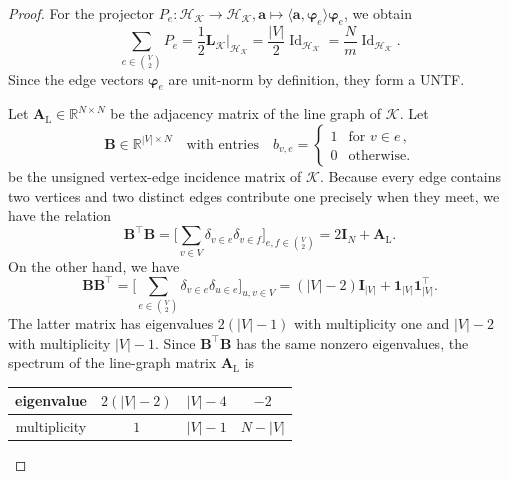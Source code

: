 \documentclass[10pt,a4paper]{amsart}
\DeclareMathOperator{\Id}{Id}
\begin{document}
\begin{proof}
    For the projector $P_e\colon\mathcal H_{\mathcal K}\to\mathcal H_{\mathcal K}, \bm a\mapsto \langle\bm a,\bm\varphi_e\rangle\bm\varphi_e$, we obtain
    \begin{equation*}
        \sum_{e\in\binom V2}P_e
        =\frac12\bm L_{\mathcal K}\big|_{\mathcal H_{\mathcal K}}
        =\frac {|V|}2\Id_{\mathcal H_{\mathcal K}}
        =\frac Nm\Id_{\mathcal H_{\mathcal K}}.
    \end{equation*}
    Since the edge vectors $\bm\varphi_e$ are unit-norm by definition, they form a UNTF.

    Let $\bm A_{\mathrm L} \in\mathds R^{N\times N}$ be the adjacency matrix of the line graph of $\mathcal K$.
    Let
    \begin{equation*}
        \bm B\in\mathds R^{|V|\times N}
        \quad\text{with entries}\quad
        b_{v,e} = \begin{cases}1 & \text{for } v\in e\,,\\0& \text{otherwise.}\end{cases}
    \end{equation*}
    be the unsigned vertex-edge incidence matrix of $\mathcal K$.
    Because every edge contains two vertices and two distinct edges contribute one precisely when they meet, we have the relation
    \begin{equation*}
        \bm B^\top\bm B
        = \Big[ \sum_{v\in V} \delta_{v\in e}\delta_{v\in f} \Big]_{e,f\in \binom{V}{2}}
        = 2\bm I_N+\bm A_{\mathrm L} .
    \end{equation*}
    On the other hand, we have
    \begin{equation*}
        \bm B\bm B^\top
        = \Big[ \sum_{e\in\binom{V}{2}} \delta_{v\in e}\delta_{u\in e} \Big]_{u,v\in V}
        = (|V|-2)\bm I_{|V|}+\bm 1_{|V|}\bm 1_{|V|}^\top .
    \end{equation*}
    The latter matrix has eigenvalues $2(|V|-1)$ with multiplicity one and $|V|-2$ with multiplicity $|V|-1$.
    Since $\bm B^\top\bm B$ has the same nonzero eigenvalues, the spectrum of the line-graph matrix $\bm A_{\mathrm L}$ is
    \begin{center}
    \begin{tabular}{c|ccc}
        eigenvalue & $2(|V|-2)$ & $|V|-4$ & $-2$ \\
        \hline
        multiplicity & $1$ & $|V|-1$ & $N-|V|$
    \end{tabular}
    \end{center}


\end{proof}
\end{document}
